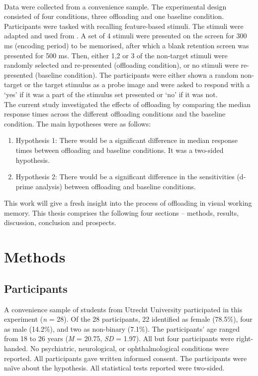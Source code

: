 \documentclass[
    a4paper,
    man,
    floatsintext,
    british
]{apa6}
\begin{document}
\\
Data were collected from a convenience sample. The experimental design consisted of four conditions, three offloading and one baseline condition. Participants were tasked with recalling feature-based stimuli. The stimuli were adapted and used from \textcite{endo_2003_perceptual}. A set of 4 stimuli were presented on the screen for 300 ms (encoding period) to be memorised, after which a blank retention screen was presented for 500 ms. Then, either 1,2 or 3 of the non-target stimuli were randomly selected and re-presented (offloading condition), or no stimuli were re-presented (baseline condition). The participants were either shown a random non-target or the target stimulus as a probe image and were asked to respond with a ‘yes’ if it was a part of the stimulus set presented or ‘no’ if it was not. 
\\
The current study investigated the effects of offloading by comparing the median response times across the different offloading conditions and the baseline condition. The main hypotheses were as follows:
\begin{enumerate}
  \item Hypothesis 1: There would be a significant difference in median response times between offloading and baseline conditions. It was a two-sided hypothesis.
  \item Hypothesis 2: There would be a significant difference in the sensitivities (d-prime analysis) between offloading and baseline conditions. 
\end{enumerate}
This work will give a fresh insight into the process of offloading in visual working memory. This thesis comprises the following four sections – methods, results, discussion, conclusion and prospects.

\section{Methods}

\subsection{Participants}
A convenience sample of students from Utrecht University participated in this experiment (\textit{n} = 28). Of the 28 participants, 22 identified as female (78.5\%), four as male (14.2\%), and two as non-binary (7.1\%). The participants’ age ranged from 18 to 26 years (\textit{M} = 20.75, \textit{SD} = 1.97). All but four participants were right-handed. No psychiatric, neurological, or ophthalmological conditions were reported. All participants gave written informed consent. The participants were naïve about the hypothesis. All statistical tests reported were two-sided.
\end{document}
